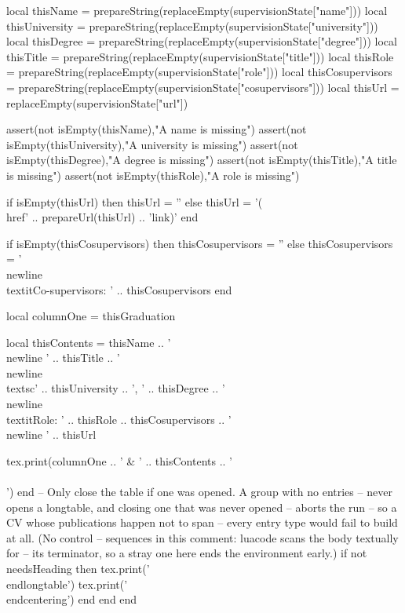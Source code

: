\documentclass[letterpaper, 10pt]{article}
\begin{document}
\begin{luacode}
				local thisName		= prepareString(replaceEmpty(supervisionState["name"]))
				local thisUniversity = prepareString(replaceEmpty(supervisionState["university"]))
				local thisDegree	 = prepareString(replaceEmpty(supervisionState["degree"]))
				local thisTitle 	 = prepareString(replaceEmpty(supervisionState["title"]))
				local thisRole   	 = prepareString(replaceEmpty(supervisionState["role"]))
				local thisCosupervisors = prepareString(replaceEmpty(supervisionState["cosupervisors"]))
				local thisUrl 		 = replaceEmpty(supervisionState["url"])

				assert(not isEmpty(thisName),"A name is missing")
				assert(not isEmpty(thisUniversity),"A university is missing")
				assert(not isEmpty(thisDegree),"A degree is missing")
				assert(not isEmpty(thisTitle),"A title is missing")
				assert(not isEmpty(thisRole),"A role is missing")

				if isEmpty(thisUrl) then
					thisUrl = ''
				else
					thisUrl = '(\\href{' .. prepareUrl(thisUrl) .. '}{link})'
				end

				if isEmpty(thisCosupervisors) then
					thisCosupervisors = ''
				else
					thisCosupervisors = '\\newline\\textit{Co-supervisors: }' .. thisCosupervisors
				end

				local columnOne = thisGraduation

				local thisContents = thisName ..
									'\\newline ' .. thisTitle ..
									'\\newline\\textsc{' .. thisUniversity .. '}, ' .. thisDegree ..
									'\\newline\\textit{Role: }' .. thisRole ..
									thisCosupervisors ..
									'\\newline ' .. thisUrl

				tex.print(columnOne .. ' & ' .. thisContents .. ' \\\\')
			end
			-- Only close the table if one was opened. A group with no entries
			-- never opens a longtable, and closing one that was never opened
			-- aborts the run -- so a CV whose publications happen not to span
			-- every entry type would fail to build at all. (No control
			-- sequences in this comment: luacode scans the body textually for
			-- its terminator, so a stray one here ends the environment early.)
			if not needsHeading then
				tex.print('\\end{longtable}')
				tex.print('\\end{centering}')
			end
		end
	end



\end{luacode}
\end{document}
